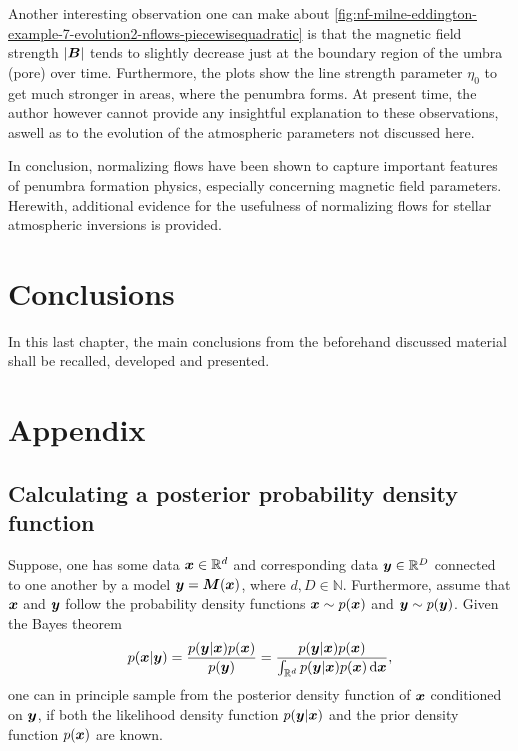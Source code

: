 \documentclass[a4paper,12pt]{report}
\begin{document}
Another interesting observation one can make about \cref{fig:nf-milne-eddington-example-7-evolution2-nflows-piecewisequadratic} is that the magnetic field strength $|\bm{B}|$ tends to slightly decrease just at the boundary region of the umbra (pore) over time. Furthermore, the plots show the line strength parameter $\eta_0$ to get much stronger in areas, where the penumbra forms. At present time, the author however cannot provide any insightful explanation to these observations, aswell as to the evolution of the atmospheric parameters not discussed here.

In conclusion, normalizing flows have been shown to capture important features of penumbra formation physics, especially concerning magnetic field parameters. Herewith, additional evidence for the usefulness of normalizing flows for stellar atmospheric inversions is provided.

\FloatBarrier
\chapter{Conclusions}
In this last chapter, the main conclusions from the beforehand discussed material shall be recalled, developed and presented.

\FloatBarrier
\chapter{Appendix}
\section{Calculating a posterior probability density function}\label{sec:MCMCsim}
Suppose, one has some data $\bm{x}\in \mathbb{R}^d$ and corresponding data $\bm{y} \in \mathbb{R}^D$ connected to one another by a model $\bm{y} = \bm{M}(\bm{x})$, where $d,D \in\mathbb{N}$. Furthermore, assume that $\bm{x}$ and $\bm{y}$ follow the probability density functions $\bm{x} \sim p(\bm{x})$ and $\bm{y} \sim p(\bm{y})$. Given the Bayes theorem \begin{align}\begin{aligned}
p(\bm{x}|\bm{y}) = \frac{p(\bm{y}|\bm{x})p(\bm{x})}{p(\bm{y})} = \frac{p(\bm{y}|\bm{x})p(\bm{x})}{\int_{\mathbb{R}^d} p(\bm{y}|\bm{x})p(\bm{x}) \,\mathrm{d}\bm{x}},
\end{aligned}\end{align} one can in principle sample from the posterior density function of $\bm{x}$ conditioned on $\bm{y}$, if both the likelihood density function $p(\bm{y}|\bm{x})$ and the prior density function $p(\bm{x})$ are known.
\end{document}
